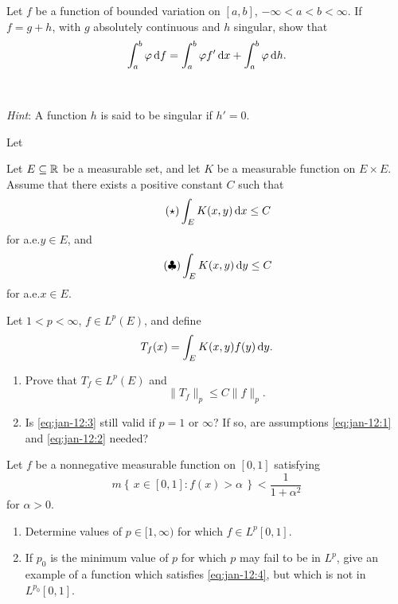 \begin{problem}
  Let \(f\) be a function of bounded variation on \([a,b]\),
  \(-\infty<a<b<\infty\). If \(f=g+h\), with \(g\) absolutely continuous
  and \(h\) singular, show that
  \[
    \int_a^b\varphi\mathop{}\!\mathrm{d} f=\int_a^b\varphi f'\mathop{}\!\mathrm{d} x+\int_a^b\varphi\mathop{}\!\mathrm{d}
    h.
  \]
  \\\\
  \emph{Hint}: A function \(h\) is said to be singular if \(h'=0\).
\end{problem}
\begin{solution}
  Let
\end{solution}

\begin{problem}
  Let \(E\subseteq\mathbb{R}\) be a measurable set, and let \(K\) be a measurable
  function on \(E\times E\). Assume that there exists a positive constant
  \(C\) such that
  \[
    \label{eq:jan-12:1}
    \tag{\(\bigstar\)}
    \int_E K(x,y)\diff x\leq C
  \]
  for a.e.\@ \(y\in E\), and
  \[
    \label{eq:jan-12:2}
    \tag{\(\clubsuit\)}
    \int_E K(x,y)\mathop{}\!\mathrm{d} y\leq C
  \]
  for a.e.\@ \(x\in E\).

  Let \(1<p<\infty\), \(f\in L^p(E)\), and define
  \[
    T_f(x)=\int_E K(x,y)f(y)\mathop{}\!\mathrm{d} y.
  \]
  \begin{enumerate}[label=(\alph*),noitemsep]
  \item Prove that \(T_f\in L^p(E)\) and
    \[
      \label{eq:jan-12:3}
      \tag{\(\spadesuit\)}
      \|T_f\|_p\leq C\|f\|_p.
    \]
  \item Is \eqref{eq:jan-12:3} still valid if \(p=1\) or \(\infty\)? If so,
    are assumptions \eqref{eq:jan-12:1} and \eqref{eq:jan-12:2} needed?
  \end{enumerate}
\end{problem}
\begin{solution}
\end{solution}

\begin{problem}
  Let \(f\) be a nonnegative measurable function on \([0,1]\) satisfying
  \[
    \label{eq:jan-12:4}%
    \tag{\(\blacklozenge\)}%
    m\left\{\,x\in[0,1]:f(x)>\alpha\,\right\}<\frac{1}{1+\alpha^2}
  \]
  for \(\alpha>0\).
  \begin{enumerate}[label=(\alph*),noitemsep]
  \item Determine values of \(p\in[1,\infty)\) for which \(f\in L^p[0,1]\).
  \item If \(p_0\) is the minimum value of \(p\) for which \(p\) may fail
    to be in \(L^p\), give an example of a function which satisfies
    \eqref{eq:jan-12:4}, but which is not in \(L^{p_0}[0,1]\).
\end{enumerate}
\end{problem}
\begin{solution}
\end{solution}


